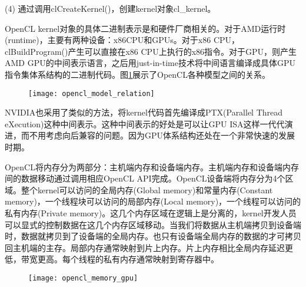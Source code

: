 (4)	通过调用clCreateKernel()，创建kernel对象cl\_kernel。

OpenCL kernel对象的具体二进制表示是和硬件厂商相关的。对于AMD运行时(runtime)，主要有两种设备：x86CPU和GPUs。对于x86 CPU，clBuildProgram()产生可以直接在x86 CPU上执行的x86指令。对于GPU，则产生AMD GPU的中间表示语言，之后用just-in-time技术将中间语言编译成具体GPU指令集体系结构的二进制代码。图\ref{fig:opencl_model_relation}展示了OpenCL各种模型之间的关系。
\begin{figure}[htbp]
	\centering
	\texttt{[image: opencl\_model\_relation]}
	\label{fig:opencl_model_relation}
\end{figure}

NVIDIA也采用了类似的方法，将kernel代码首先编译成PTX(Parallel Thread eXecution)这种中间表示。这种中间表示的好处是可以让GPU ISA这样一代代演进，而不用考虑向后兼容的问题。因为GPU体系结构还处在一个非常快速的发展时期。

%
%

OpenCL将内存分为两部分：主机端内存和设备端内存。主机端内存和设备端内存间的数据移动通过调用相应OpenCL API完成。OpenCL设备端将内存分为4个区域。整个kernel可以访问的全局内存(Global memory)和常量内存(Constant memory)，一个线程块可以访问的局部内存(Local memory)，一个线程可以访问的私有内存(Private memory)。这几个内存区域在逻辑上是分离的，kernel开发人员可以显式的控制数据在这几个内存区域移动。当我们将数据从主机端拷贝到设备端时，数据就拷贝到了设备端的全局内存。也只有设备端全局内存的数据的才可拷贝回主机端的主存。局部内存通常映射到片上内存。片上内存相比全局内存延迟更低，带宽更高。每个线程的私有内存通常映射到寄存器中。

\begin{figure}[htbp]
	\centering
	\texttt{[image: opencl\_memory\_gpu]}
	\label{fig:opencl_memory_gpu}
\end{figure}

